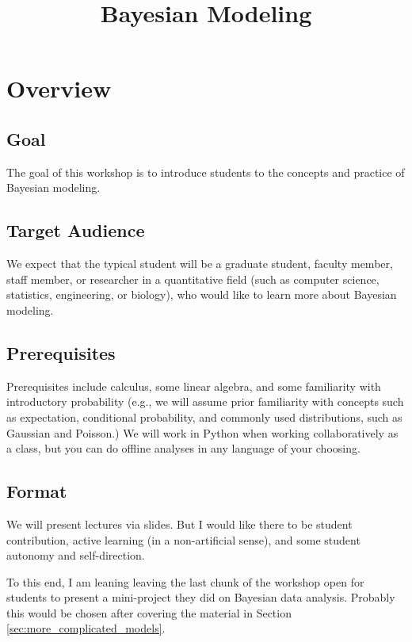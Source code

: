 \documentclass{article} %
\begin{document}
\title{Bayesian Modeling} 

\maketitle
\tableofcontents

\section{Overview}

\subsection{Goal}  The goal of this workshop is to introduce students to the concepts and practice of Bayesian modeling.  

\subsection{Target Audience}  We expect that the typical student will be a graduate student, faculty member, staff member, or researcher in a quantitative field (such as computer science,  statistics,  engineering, or biology),  who would like to learn more about Bayesian modeling.  

\subsection{Prerequisites} Prerequisites include calculus,  some linear algebra, and some familiarity with introductory probability (e.g.,  we will assume prior familiarity with concepts such as expectation,  conditional probability,  and commonly used distributions,  such as Gaussian and Poisson.)      We will work in Python when working collaboratively as a class,  but you can do offline analyses in any language of your choosing. 

\subsection{Format}

We will present lectures via slides.   But I would like there to be student contribution,  active learning (in a non-artificial sense),  and some student autonomy and self-direction. 

To this end,  I am leaning leaving the last chunk of the workshop  open for students to present a mini-project they did on Bayesian data analysis.  Probably this would be chosen after covering the material in Section \ref{sec:more_complicated_models}.
\end{document}

